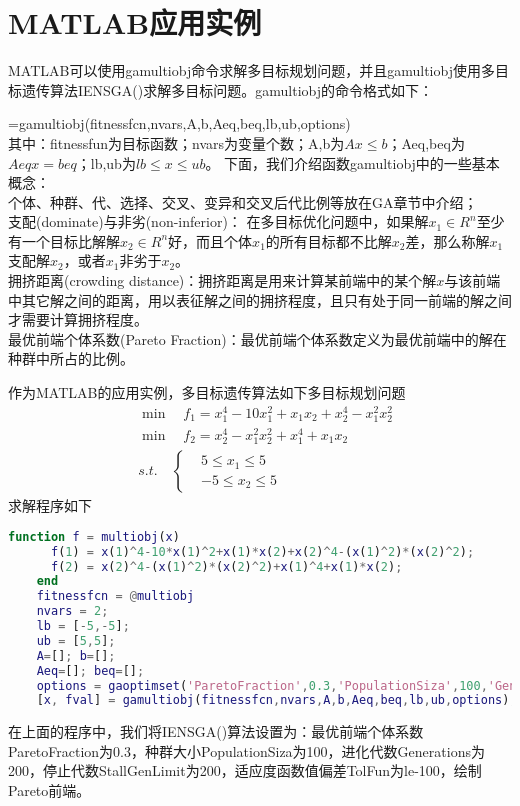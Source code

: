 \section{MATLAB应用实例}
    \par
    MATLAB可以使用gamultiobj命令求解多目标规划问题，并且gamultiobj使用多目标遗传算法IENSGA()求解多目标问题。gamultiobj的命令格式如下：
    \par
    [x,fval]=gamultiobj(fitnessfcn,nvars,A,b,Aeq,beq,lb,ub,options)\\
    其中：fitnessfun为目标函数；nvars为变量个数；A,b为$Ax\leqslant b$；Aeq,beq为$Aeq {}x= beq$；lb,ub为$lb \leqslant x \leqslant ub$。
    下面，我们介绍函数gamultiobj中的一些基本概念：\\
    个体、种群、代、选择、交叉、变异和交叉后代比例等放在GA章节中介绍；\\
    支配(dominate)与非劣(non-inferior)：
    在多目标优化问题中，如果解$x_1 \in R^n$至少有一个目标比解解$x_2 \in R^n$好，而且个体$x_1$的所有目标都不比解$x_2$差，那么称解$x_1$支配解$x_2$，或者$x_1$非劣于$x_2$。\\
    拥挤距离(crowding distance)：拥挤距离是用来计算某前端中的某个解$x$与该前端中其它解之间的距离，用以表征解之间的拥挤程度，且只有处于同一前端的解之间才需要计算拥挤程度。\\
    最优前端个体系数(Pareto Fraction)：最优前端个体系数定义为最优前端中的解在种群中所占的比例。
    \par
    作为MATLAB的应用实例，多目标遗传算法如下多目标规划问题
    \begin{align*}
       & {\min}\quad f_1=x_1^4-10x_1^2+x_1x_2+x_2^4-x_1^2x_2^2\\
       & {\min}\quad f_2=x_2^4-x_1^2x_2^2+x_1^4+x_1x_2\\
       & s.t.\quad \left\{\begin{aligned}
       & 5 \leqslant x_1 \leqslant 5\\
       & -5 \leqslant x_2 \leqslant 5
       \end{aligned}
       \right.
    \end{align*}
    求解程序如下
    \begin{lstlisting}[language=Matlab]
    function f = multiobj(x)
      f(1) = x(1)^4-10*x(1)^2+x(1)*x(2)+x(2)^4-(x(1)^2)*(x(2)^2);
      f(2) = x(2)^4-(x(1)^2)*(x(2)^2)+x(1)^4+x(1)*x(2);
    end
    fitnessfcn = @multiobj
    nvars = 2;
    lb = [-5,-5];
    ub = [5,5];
    A=[]; b=[];
    Aeq=[]; beq=[];
    options = gaoptimset('ParetoFraction',0.3,'PopulationSiza',100,'Generations',200,'StallGenLimit',200,'TolFun',le-100,'PlotFcns',@gaplotpareto);
    [x, fval] = gamultiobj(fitnessfcn,nvars,A,b,Aeq,beq,lb,ub,options);
    \end{lstlisting}
    \par
    在上面的程序中，我们将IENSGA()算法设置为：最优前端个体系数ParetoFraction为0.3，种群大小PopulationSiza为100，进化代数Generations为200，停止代数StallGenLimit为200，适应度函数值偏差TolFun为le-100，绘制Pareto前端。

